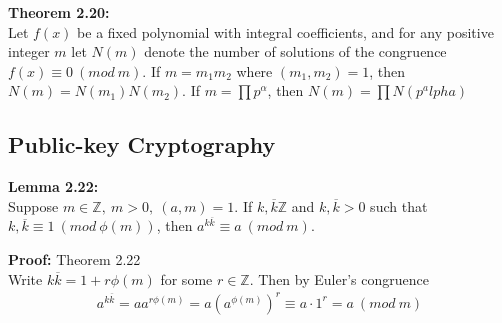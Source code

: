 \documentclass[a4paper]{article}
\begin{document}

\textbf{Theorem 2.20:}\\
Let $f(x)$ be a fixed polynomial with integral coefficients, and for any positive integer $m$ let $N(m)$ denote the number of solutions of the congruence $f(x)\equiv0\ (mod\ m)$. If $m=m_1m_2$ where $(m_1,m_2)=1$, then $N(m)=N(m_1)N(m_2)$. If $m=\prod p^\alpha$, then $N(m)=\prod N(p^alpha)$

\subsection{Public-key Cryptography}

\textbf{Lemma 2.22:}\\
Suppose $m\in\mathbb{Z},\ m>0,\ (a,m)=1$. If $k,\overline{k}\mathbb{Z}$ and $k,\overline{k}>0$ such that $k,\overline{k}\equiv1\ (mod\ \phi(m))$, then $a^{k\overline{k}}\equiv a\ (mod\ m)$.

\textbf{Proof:} Theorem 2.22\\
Write $k\overline{k}=1+r\phi(m)$ for some $r\in\mathbb{Z}$. Then by Euler's congruence
\begin{align*}
    a^{k\overline{k}} = aa^{r\phi(m)} = a(a^{\phi(m)})^r \equiv a\cdot1^r = a\ (mod\ m)
\end{align*}
\end{document}
